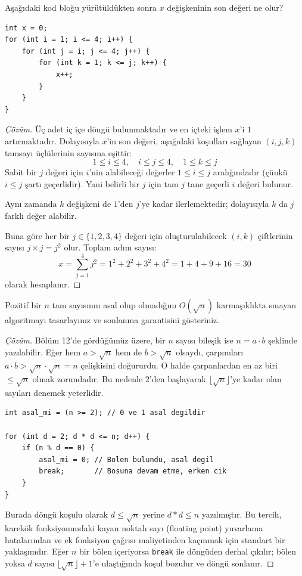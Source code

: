 \begin{example}
Aşağıdaki kod bloğu yürütüldükten sonra $x$ değişkeninin son değeri ne olur?
\begin{lstlisting}[language=CTemel]
int x = 0;
for (int i = 1; i <= 4; i++) {
    for (int j = i; j <= 4; j++) {
        for (int k = 1; k <= j; k++) {
            x++;
        }
    }
}
\end{lstlisting}
\end{example}

\begin{proof}[Çözüm]
Üç adet iç içe döngü bulunmaktadır ve en içteki işlem $x$'i $1$ artırmaktadır. Dolayısıyla $x$'in son değeri, aşağıdaki koşulları sağlayan $(i, j, k)$ tamsayı üçlülerinin sayısına eşittir:
\[
1 \le i \le 4, \quad i \le j \le 4, \quad 1 \le k \le j
\]
Sabit bir $j$ değeri için $i$'nin alabileceği değerler $1 \le i \le j$ aralığındadır (çünkü $i \le j$ şartı geçerlidir). Yani belirli bir $j$ için tam $j$ tane geçerli $i$ değeri bulunur.

Aynı zamanda $k$ değişkeni de $1$'den $j$'ye kadar ilerlemektedir; dolayısıyla $k$ da $j$ farklı değer alabilir.

Buna göre her bir $j \in \{1, 2, 3, 4\}$ değeri için oluşturulabilecek $(i, k)$ çiftlerinin sayısı $j \times j = j^2$ olur.
Toplam adım sayısı:
\[
x = \sum_{j=1}^{4} j^2 = 1^2 + 2^2 + 3^2 + 4^2 = 1 + 4 + 9 + 16 = 30
\]
olarak hesaplanır.
\end{proof}

\begin{example}
Pozitif bir $n$ tam sayısının asal olup olmadığını $O(\sqrt{n})$ karmaşıklıkta sınayan algoritmayı tasarlayınız ve sonlanma garantisini gösteriniz.
\end{example}

\begin{proof}[Çözüm]
Bölüm 12'de gördüğümüz üzere, bir $n$ sayısı bileşik ise $n = a \cdot b$ şeklinde yazılabilir. Eğer hem $a > \sqrt{n}$ hem de $b > \sqrt{n}$ olsaydı, çarpımları $a \cdot b > \sqrt{n} \cdot \sqrt{n} = n$ çelişkisini doğururdu. O halde çarpanlardan en az biri $\le \sqrt{n}$ olmak zorundadır. Bu nedenle $2$'den başlayarak $\lfloor\sqrt{n}\rfloor$'ye kadar olan sayıları denemek yeterlidir.

\begin{lstlisting}[language=CTemel]
int asal_mi = (n >= 2); // 0 ve 1 asal degildir

for (int d = 2; d * d <= n; d++) {
    if (n % d == 0) {
        asal_mi = 0; // Bolen bulundu, asal degil
        break;       // Bosuna devam etme, erken cik
    }
}
\end{lstlisting}

Burada döngü koşulu olarak $d \le \sqrt{n}$ yerine $d * d \le n$ yazılmıştır. Bu tercih, karekök fonksiyonundaki kayan noktalı sayı (floating point) yuvarlama hatalarından ve ek fonksiyon çağrısı maliyetinden kaçınmak için standart bir yaklaşımdır. Eğer $n$ bir bölen içeriyorsa \texttt{break} ile döngüden derhal çıkılır; bölen yoksa $d$ sayısı $\lfloor\sqrt{n}\rfloor + 1$'e ulaştığında koşul bozulur ve döngü sonlanır.
\end{proof}

